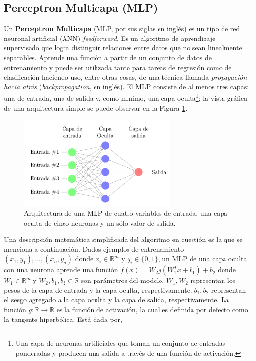   \subsection{Perceptron Multicapa (MLP)}

    \par Un \textbf{Perceptron Multicapa} (MLP, por sus siglas en inglés)\cite{mlp_intro1, mlp_intro2} es un tipo
      de red neuronal artificial (ANN) \textit{feedforward}.
      Es un algoritmo de aprendizaje supervisado que logra distinguir
      relaciones entre datos que no sean linealmente separables. Aprende una función
      a partir de un conjunto de datos de entrenamiento y puede ser
      utilizada tanto para tareas de regresión como de clasificación haciendo uso, entre
      otras cosas, de una técnica llamada \textit{propagación hacia atrás}\cite{backpropagation}
      (\textit{backpropagation}, en inglés).
      El MLP consiste de al menos tres capas: una de entrada, una de salida y,
      como mínimo, una capa oculta\footnote{Una capa de neuronas artificiales que toman un conjunto
      de entradas ponderadas y producen una salida a través de una función de activación.};
      la vista gráfica de una arquitectura simple se puede observar en la
      Figura \ref{fig:mlp_ejemplo}.
      \begin{figure}
      \centering%
      \includegraphics[width=0.7\textwidth]{images/ejemplo_mlp}%
      \caption{Arquitectura de una MLP de cuatro variables de entrada, una capa
              oculta de cinco neuronas y un sólo valor de salida.}\label{fig:mlp_ejemplo}
      \end{figure}

    \par Una descripción matemática simplificada del algoritmo en cuestión es la
      que se menciona a continuación.
      Dados ejemplos de entrenamiento $(x_{1}, y_{1}), \dots, (x_{n}, y_{n})$
      donde $x_{i} \in \mathbb{R}^{m}$ y $y_{i} \in \{0,1\}$, un MLP de una capa oculta
      con una neurona aprende una función $f(x) = W_{2}g(W_{1}^{T} x + b_{1}) + b_{2}$
      donde $W_{1} \in \mathbb{R}^{m}$ y $W_{2}, b_{1}, b_{2} \in \mathbb{R}$ son
      parámetros del modelo. $W_{1}, W_{2}$ representan los pesos de la capa de entrada y la
      capa oculta, respectivamente. $b_{1}, b_{2}$ representan el sesgo agregado a
      la capa oculta y la capa de salida, respectivamente. La función
      $g: \mathbb{R} \rightarrow \mathbb{R}$ es la función de activación, la cual
      es definida por defecto como la tangente hiperbólica. Está dada por,

